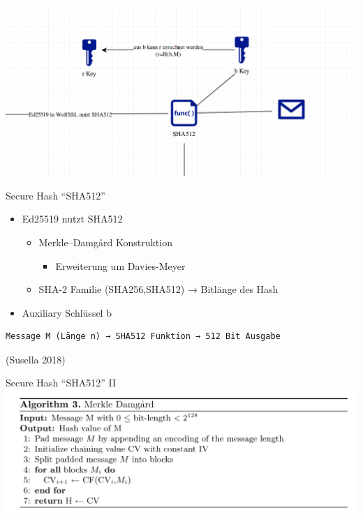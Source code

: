 \documentclass[
  10pt,
  ignorenonframetext,
  aspectratio=169,
]{beamer}
\providecommand{\tightlist}{%
  \setlength{\itemsep}{0pt}\setlength{\parskip}{0pt}}
\begin{document}
\begin{frame}{}
\protect\hypertarget{section-3}{}
\includegraphics{Abbildungen/Punkt2.png}
\end{frame}

\begin{frame}[fragile]{Secure Hash ``SHA512''}
\protect\hypertarget{secure-hash-sha512}{}
\begin{itemize}
\tightlist
\item
  Ed25519 nutzt SHA512

  \begin{itemize}
  \tightlist
  \item
    Merkle--Damgård Konstruktion

    \begin{itemize}
    \tightlist
    \item
      Erweiterung um Davies-Meyer
    \end{itemize}
  \item
    SHA-2 Familie (SHA256,SHA512) → Bitlänge des Hash
  \end{itemize}
\item
  Auxiliary Schlüssel b
\end{itemize}

\begin{verbatim}
Message M (Länge n) → SHA512 Funktion → 512 Bit Ausgabe
\end{verbatim}

(Susella 2018)
\end{frame}

\begin{frame}{Secure Hash ``SHA512'' II}
\protect\hypertarget{secure-hash-sha512-ii}{}
\includegraphics{Abbildungen/MD.png}
\end{frame}
\end{document}
